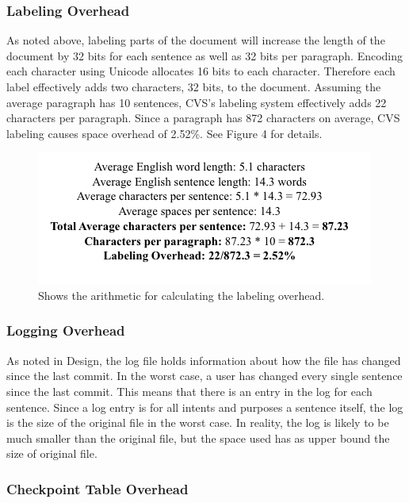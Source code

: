 \subsubsection{Labeling Overhead}

As noted above, labeling parts of the document will increase the length of the document by 32 bits for each sentence as well as 32 bits per paragraph.  Encoding each character using Unicode allocates 16 bits to each character.  Therefore each label effectively adds two characters, 32 bits, to the document.  Assuming the average paragraph has 10 sentences, CVS's labeling system effectively adds 22 characters per paragraph.  Since a paragraph has 872 characters on average, CVS labeling causes space overhead of 2.52\%.  See Figure 4 for details.

\begin{figure}
\begin{center}
\includegraphics[scale=0.55]{analysis_figure_2.png}
\end{center}
\caption{Shows the arithmetic for calculating the labeling overhead.}
\end{figure}



\subsubsection{Logging Overhead}

As noted in Design, the log file holds information about how the file has changed since the last commit.  In the worst case, a user has changed every single sentence since the last commit.  This means that there is an entry in the log for each sentence.  Since a log entry is for all intents and purposes a sentence itself, the log is the size of the original file in the worst case.  In reality, the log is likely to be much smaller than the original file, but the space used has as upper bound the size of original file.

\subsubsection{Checkpoint Table Overhead}

